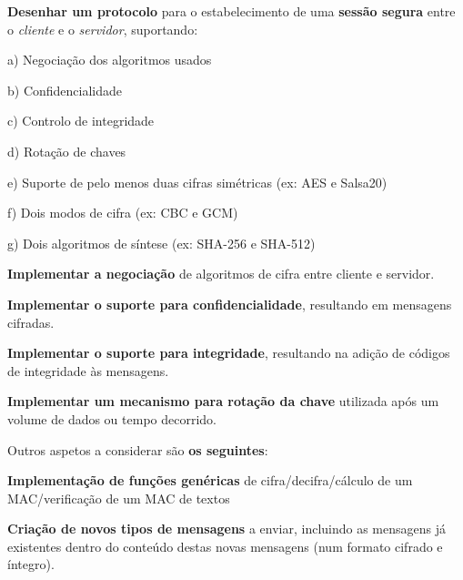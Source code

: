 \begin{DoxyEnumerate}
\item {\bfseries Desenhar um protocolo} para o estabelecimento de uma {\bfseries sessão segura} entre o {\itshape cliente} e o {\itshape servidor}, suportando\+:
\begin{DoxyItemize}
\item a) Negociação dos algoritmos usados
\item b) Confidencialidade
\item c) Controlo de integridade
\item d) Rotação de chaves
\item e) Suporte de pelo menos duas cifras simétricas (ex\+: A\+ES e Salsa20)
\item f) Dois modos de cifra (ex\+: C\+BC e G\+CM)
\item g) Dois algoritmos de síntese (ex\+: S\+H\+A-\/256 e S\+H\+A-\/512)
\end{DoxyItemize}
\item {\bfseries Implementar a negociação} de algoritmos de cifra entre cliente e servidor.
\item {\bfseries Implementar o suporte para confidencialidade}, resultando em mensagens cifradas.
\item {\bfseries Implementar o suporte para integridade}, resultando na adição de códigos de integridade às mensagens.
\item {\bfseries Implementar um mecanismo para rotação da chave} utilizada após um volume de dados ou tempo decorrido.
\end{DoxyEnumerate}

Outros aspetos a considerar são {\bfseries os seguintes}\+:


\begin{DoxyItemize}
\item {\bfseries Implementação de funções genéricas} de cifra/decifra/cálculo de um M\+A\+C/verificação de um M\+AC de textos
\item {\bfseries Criação de novos tipos de mensagens} a enviar, incluindo as mensagens já existentes dentro do conteúdo destas novas mensagens (num formato cifrado e íntegro). 
\end{DoxyItemize}
